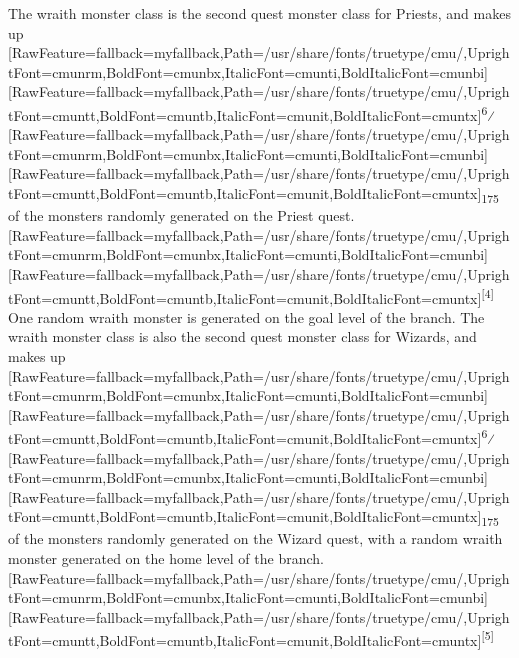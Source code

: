 \documentclass[fontsize=11pt,paper=A4,BCOR=12mm,DIV=13,open=any,listof=totoc,toc=flat]{scrbook}
\begin{document}
The wraith monster class is the second quest\footnotemark[21] monster class for Priests\footnotemark[22], and makes up \allowbreak{}\setmainfont{cmunrm.ttf}[RawFeature={fallback=myfallback},Path=/usr/share/fonts/truetype/cmu/,UprightFont=cmunrm,BoldFont=cmunbx,ItalicFont=cmunti,BoldItalicFont=cmunbi]\setmonofont{cmunrm.ttf}[RawFeature={fallback=myfallback},Path=/usr/share/fonts/truetype/cmu/,UprightFont=cmuntt,BoldFont=cmuntb,ItalicFont=cmunit,BoldItalicFont=cmuntx]\textsuperscript{6}⁄\allowbreak{}\setmainfont{cmunrm.ttf}[RawFeature={fallback=myfallback},Path=/usr/share/fonts/truetype/cmu/,UprightFont=cmunrm,BoldFont=cmunbx,ItalicFont=cmunti,BoldItalicFont=cmunbi]\setmonofont{cmunrm.ttf}[RawFeature={fallback=myfallback},Path=/usr/share/fonts/truetype/cmu/,UprightFont=cmuntt,BoldFont=cmuntb,ItalicFont=cmunit,BoldItalicFont=cmuntx]\textsubscript{175} of the monsters randomly generated on the Priest quest\footnotemark[23].\allowbreak{}\setmainfont{cmunrm.ttf}[RawFeature={fallback=myfallback},Path=/usr/share/fonts/truetype/cmu/,UprightFont=cmunrm,BoldFont=cmunbx,ItalicFont=cmunti,BoldItalicFont=cmunbi]\setmonofont{cmunrm.ttf}[RawFeature={fallback=myfallback},Path=/usr/share/fonts/truetype/cmu/,UprightFont=cmuntt,BoldFont=cmuntb,ItalicFont=cmunit,BoldItalicFont=cmuntx]\textsuperscript{{$\text{[}$}4{$\text{]}$}} One random wraith monster is generated on the goal level of the branch. The wraith monster class is also the second quest\footnotemark[24] monster class for Wizards\footnotemark[25], and makes up \allowbreak{}\setmainfont{cmunrm.ttf}[RawFeature={fallback=myfallback},Path=/usr/share/fonts/truetype/cmu/,UprightFont=cmunrm,BoldFont=cmunbx,ItalicFont=cmunti,BoldItalicFont=cmunbi]\setmonofont{cmunrm.ttf}[RawFeature={fallback=myfallback},Path=/usr/share/fonts/truetype/cmu/,UprightFont=cmuntt,BoldFont=cmuntb,ItalicFont=cmunit,BoldItalicFont=cmuntx]\textsuperscript{6}⁄\allowbreak{}\setmainfont{cmunrm.ttf}[RawFeature={fallback=myfallback},Path=/usr/share/fonts/truetype/cmu/,UprightFont=cmunrm,BoldFont=cmunbx,ItalicFont=cmunti,BoldItalicFont=cmunbi]\setmonofont{cmunrm.ttf}[RawFeature={fallback=myfallback},Path=/usr/share/fonts/truetype/cmu/,UprightFont=cmuntt,BoldFont=cmuntb,ItalicFont=cmunit,BoldItalicFont=cmuntx]\textsubscript{175} of the monsters randomly generated on the Wizard quest\footnotemark[26], with a random wraith monster generated on the home level of the branch.\allowbreak{}\setmainfont{cmunrm.ttf}[RawFeature={fallback=myfallback},Path=/usr/share/fonts/truetype/cmu/,UprightFont=cmunrm,BoldFont=cmunbx,ItalicFont=cmunti,BoldItalicFont=cmunbi]\setmonofont{cmunrm.ttf}[RawFeature={fallback=myfallback},Path=/usr/share/fonts/truetype/cmu/,UprightFont=cmuntt,BoldFont=cmuntb,ItalicFont=cmunit,BoldItalicFont=cmuntx]\textsuperscript{{$\text{[}$}5{$\text{]}$}} 
\end{document}
